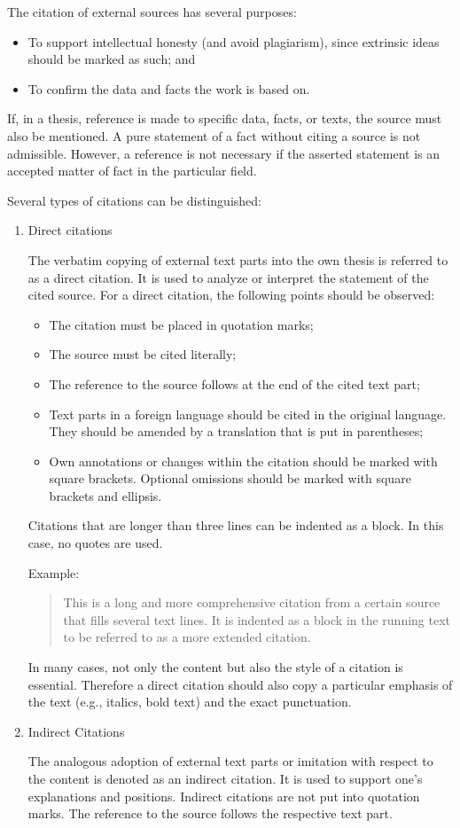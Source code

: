 The citation of external sources has several purposes:
\begin{itemize}
	\item To support intellectual honesty (and avoid plagiarism), since extrinsic ideas should be marked as such; and
	\item To confirm the data and facts the work is based on.
\end{itemize}

If, in a thesis, reference is made to specific data, facts, or texts, the source must also be mentioned. A pure statement of a fact without citing a source is not admissible. However, a reference is not necessary if the asserted statement is an accepted matter of fact in the particular field.

Several types of citations can be distinguished:
\begin{enumerate}
	\item Direct citations
	
	The verbatim copying of external text parts into the own thesis is referred to as a direct citation. It is used to analyze or interpret the statement of the cited source. For a direct citation, the following points should be observed:
\begin{itemize}
	\item The citation must be placed in quotation marks;
	\item The source must be cited literally;
	\item The reference to the source follows at the end of the cited text part;
	\item Text parts in a foreign language should be cited in the original language. They should be amended by a translation that is put in parentheses;
	\item Own annotations or changes within the citation should be marked with square brackets. Optional omissions should be marked with square brackets and ellipsis.
\end{itemize}

Citations that are longer than three lines can be indented as a block. In this case, no quotes are used.

Example:
\begin{quote}
	This is a long and more comprehensive citation from a certain source that fills several text lines. It is indented as a block in the running text to be referred to as a more extended citation.
\end{quote}

In many cases, not only the content but also the style of a citation is essential. Therefore a direct citation should also copy a particular emphasis of the text (e.g., italics, bold text) and the exact punctuation.

	\item Indirect Citations

	The analogous adoption of external text parts or imitation with respect to the content is denoted as an indirect citation. It is used to support one's explanations and positions. Indirect citations are not put into quotation marks. The reference to the source follows the respective text part.
\end{enumerate}

